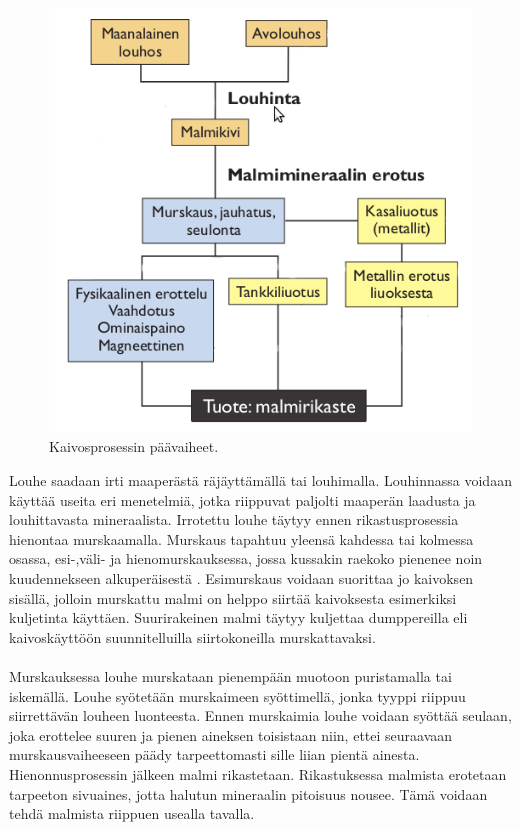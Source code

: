 \documentclass[finnish,12pt,a4paper,pdftex,elec,utf8]{aaltothesis}
\begin{document}
\begin{figure}[H]
	\begin{center}
	\includegraphics[scale=0.8]{Kaivosprosessi}
	\end{center}
	\caption{Kaivosprosessin päävaiheet.
		\cite{Kaivosprosessi}}
	\label{fig:Kaivosprosessi}
	
\end{figure}
\noindent
Louhe saadaan irti maaperästä räjäyttämällä tai louhimalla. Louhinnassa voidaan käyttää useita eri menetelmiä, jotka riippuvat paljolti maaperän laadusta ja louhittavasta mineraalista. Irrotettu louhe täytyy ennen rikastusprosessia hienontaa murskaamalla. Murskaus tapahtuu yleensä kahdessa tai kolmessa osassa, esi-,väli- ja hienomurskauksessa, jossa kussakin raekoko pienenee noin kuudennekseen alkuperäisestä \cite[s. 198]{Hakapää}. Esimurskaus voidaan suorittaa jo kaivoksen sisällä, jolloin murskattu malmi on helppo siirtää kaivoksesta esimerkiksi kuljetinta käyttäen. Suurirakeinen malmi täytyy kuljettaa dumppereilla eli kaivoskäyttöön suunnitelluilla siirtokoneilla murskattavaksi. 
\\\\
Murskauksessa louhe murskataan pienempään muotoon puristamalla tai iskemällä. Louhe syötetään murskaimeen syöttimellä, jonka tyyppi riippuu siirrettävän louheen luonteesta. Ennen murskaimia louhe voidaan syöttää seulaan, joka erottelee suuren ja pienen aineksen toisistaan niin, ettei seuraavaan murskausvaiheeseen päädy tarpeettomasti sille liian pientä ainesta. Hienonnusprosessin jälkeen malmi rikastetaan. Rikastuksessa malmista erotetaan tarpeeton sivuaines, jotta halutun mineraalin pitoisuus nousee. Tämä voidaan tehdä malmista riippuen usealla tavalla. \cite[s. 197-199]{Hakapää}
\end{document}
